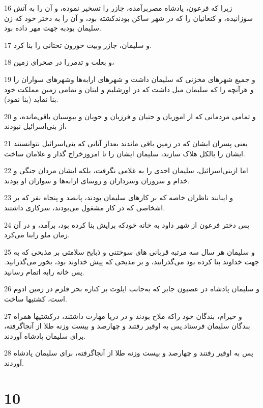 \par 16 زیرا که فرعون، پادشاه مصربرآمده، جازر را تسخیر نموده، و آن را به آتش سوزانیده، و کنعانیان را که در شهر ساکن بودندکشته بود، و آن را به دختر خود که زن سلیمان بودبه جهت مهر داده بود.
\par 17 و سلیمان، جازر وبیت حورون تحتانی را بنا کرد.
\par 18 و بعلت و تدمررا در صحرای زمین،
\par 19 و جمیع شهرهای مخزنی که سلیمان داشت و شهرهای ارابه‌ها وشهرهای سواران را و هر‌آنچه را که سلیمان میل داشت که در اورشلیم و لبنان و تمامی زمین مملکت خود بنا نماید (بنا نمود).
\par 20 و تمامی مردمانی که از اموریان و حتیان و فرزیان و حویان و یبوسیان باقی‌مانده، و از بنی‌اسرائیل نبودند،
\par 21 یعنی پسران ایشان که در زمین باقی ماندند بعداز آنانی که بنی‌اسرائیل نتوانستند ایشان را بالکل هلاک سازند، سلیمان ایشان را تا امروزخراج گذار و غلامان ساخت.
\par 22 اما ازبنی‌اسرائیل، سلیمان احدی را به غلامی نگرفت، بلکه ایشان مردان جنگی و خدام و سروران وسرداران و روسای ارابه‌ها و سواران او بودند.
\par 23 و اینانند ناظران خاصه که بر کارهای سلیمان بودند، پانصد و پنجاه نفر که بر اشخاصی که در کار مشغول می‌بودند، سرکاری داشتند.
\par 24 پس دختر فرعون از شهر داود به خانه خودکه برایش بنا کرده بود، برآمد، و در آن زمان ملو رابنا می‌کرد.
\par 25 و سلیمان هر سال سه مرتبه قربانی های سوختنی و ذبایح سلامتی بر مذبحی که به جهت خداوند بنا کرده بود می‌گذرانید، و بر مذبحی که پیش خداوند بود، بخور می‌گذرانید. پس خانه رابه اتمام رسانید.
\par 26 و سلیمان پادشاه در عصیون جابر که به‌جانب ایلوت بر کناره بحر قلزم در زمین ادوم است، کشتیها ساخت.
\par 27 و حیرام، بندگان خود راکه ملاح بودند و در دریا مهارت داشتند، درکشتیها همراه بندگان سلیمان فرستاد.پس به اوفیر رفتند و چهارصد و بیست وزنه طلا از آنجاگرفته، برای سلیمان پادشاه آوردند.
\par 28 پس به اوفیر رفتند و چهارصد و بیست وزنه طلا از آنجاگرفته، برای سلیمان پادشاه آوردند.
 
\chapter{10}

